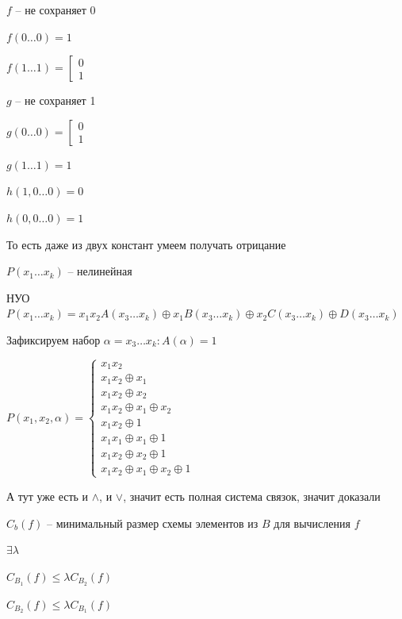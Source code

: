 \documentclass[12pt]{article}
\begin{document}
\begin{Proof}{}

$f$ -- не сохраняет 0

$f(0 \ldots 0) = 1$

$f(1 \ldots 1) = \left[ \begin{gathered}
    0 \\
    1
\end{gathered} \right.$

$g$ -- не сохраняет 1

$g(0 \ldots 0) = \left[ \begin{gathered}
    0 \\
    1
\end{gathered} \right.$

$g(1 \ldots 1) = 1$

$h(1, 0 \ldots 0) = 0$

$h(0, 0 \ldots 0) = 1$

То есть даже из двух констант умеем получать отрицание

$P(x_1 \ldots x_k)$ -- нелинейная

НУО $P(x_1 \ldots x_k) = x_1x_2A(x_3 \ldots x_k) \oplus x_1B(x_3 \ldots x_k) \oplus x_2C(x_3 \ldots x_k) \oplus D(x_3 \ldots x_k)$

Зафиксируем набор $\alpha = x_3 \ldots x_k : A(\alpha) = 1$

$P(x_1, x_2, \alpha) = \begin{cases}
    x_1x_2 \\
    x_1x_2 \oplus x_1 \\
    x_1x_2 \oplus x_2 \\
    x_1x_2 \oplus x_1 \oplus x_2 \\
    x_1x_2 \oplus 1 \\
    x_1x_1 \oplus x_1 \oplus 1 \\
    x_1x_2 \oplus x_2 \oplus 1 \\
    x_1x_2 \oplus x_1 \oplus x_2 \oplus 1
\end{cases}$

А тут уже есть и $\land$, и $\lor$, значит есть полная система связок, значит доказали

\end{Proof}

\begin{defin}{}
    $C_b(f)$ -- минимальный размер схемы элементов из $B$ для вычисления $f$
\end{defin}

\begin{Remark}{}
    $\exists \lambda$

    $C_{B_1}(f) \leq \lambda C_{B_2}(f)$

    $C_{B_2}(f) \leq \lambda C_{B_1}(f)$
\end{Remark}
\end{document}
